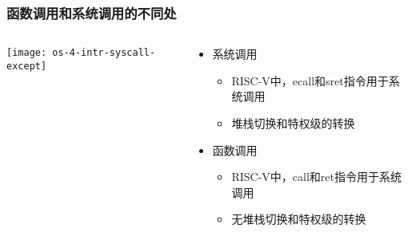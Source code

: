 \begin{frame}[plain]
	\frametitle{函数调用和系统调用的不同处}
	\begin{columns}
		
		\begin{column}{0.45\textwidth}
			\centering
			\texttt{[image: os-4-intr-syscall-except]}
			
		\end{column}
		
		\begin{column}{0.5\textwidth}
		
		  \begin{itemize}  
			\item 系统调用 \pause
			\begin{itemize}  
				\item RISC-V中，ecall和sret指令用于系统调用 \pause
				\item 堆栈切换和特权级的转换
			\end{itemize} \pause


			\item 函数调用
			\begin{itemize}  
				\item RISC-V中，call和ret指令用于系统调用
				\item 无堆栈切换和特权级的转换
			\end{itemize}	
			
			\end{itemize}			
		\end{column}
		
	\end{columns}
	
\end{frame}


